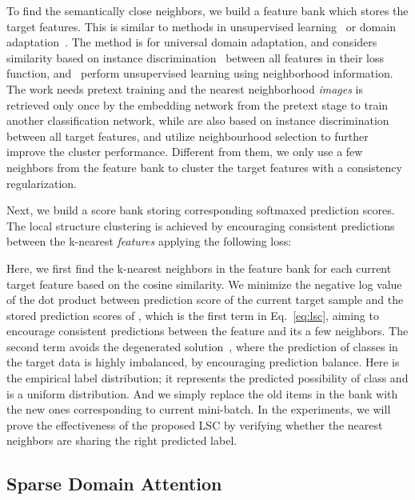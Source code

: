 \documentclass[10pt,twocolumn,letterpaper]{article}
\begin{document}
To find the semantically close neighbors, we build a feature bank  which stores the target features. This is similar to methods in unsupervised learning~\cite{wu2018unsupervised,huang2019unsupervised,zhuang2019local,van2020scan} or domain adaptation~\cite{saito2020universal}. The method \cite{saito2020universal} is for universal domain adaptation, and considers similarity based on instance discrimination~\cite{wu2018unsupervised} between all features in their loss function, and~\cite{huang2019unsupervised,van2020scan,zhuang2019local} perform unsupervised learning using neighborhood information. The work \cite{van2020scan} needs pretext training and the nearest neighborhood \textit{images} is retrieved only once by the embedding network from the pretext stage to train another classification network, while \cite{huang2019unsupervised,zhuang2019local} are also based on instance discrimination between all target features, and utilize neighbourhood selection to further improve the cluster performance. Different from them, we only use a few neighbors from the feature bank to cluster the target features with a consistency regularization.

Next, we build
a score bank  storing corresponding softmaxed prediction scores. The local structure clustering is achieved by encouraging consistent predictions between the k-nearest \textit{features} applying the following loss:

Here, we first find the k-nearest neighbors  in the feature bank for each current target feature based on the cosine similarity.
We minimize the negative log value of the dot product between prediction score of the current target sample  and the stored prediction scores  of , which is the first term in Eq.~\ref{eq:lsc}, aiming to encourage consistent predictions between the feature and its a few neighbors. The second term avoids the degenerated solution~\cite{shi2012information,ghasedi2017deep}, where the prediction of classes in the target data is highly imbalanced, by encouraging prediction balance. Here  is the empirical label distribution; it represents the predicted possibility of class  and  is a uniform distribution. And we simply replace the old items in the bank with the new ones corresponding to current mini-batch. In the experiments, we will prove the effectiveness of the proposed LSC by verifying whether the nearest neighbors are sharing the right predicted label.






\subsection{Sparse Domain Attention}
\end{document}
